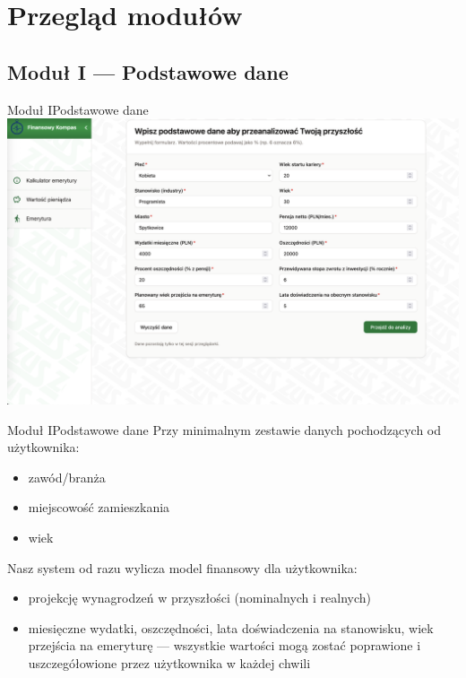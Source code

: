 \section{Przegląd modułów}

\subsection{Moduł I --- Podstawowe dane}

\begin{frame}[t]{Moduł I}{Podstawowe dane}
\includegraphics[width=.8\textwidth]{img/module_1_basic_data}
\end{frame}

\begin{frame}[t]{Moduł I}{Podstawowe dane}
    Przy minimalnym zestawie danych pochodzących od użytkownika:
    \pause
    \begin{itemize}
    \item zawód/branża
    \pause
    \item miejscowość zamieszkania
    \pause
    \item wiek
    \end{itemize}
    \pause
    Nasz system od razu wylicza model finansowy dla użytkownika:
    \begin{itemize}
    \pause
        \item projekcję wynagrodzeń w przyszłości (nominalnych i realnych)
    \pause
        \item miesięczne wydatki, oszczędności, lata doświadczenia na stanowisku, wiek przejścia na emeryturę
\pause --- wszystkie wartości mogą zostać poprawione i uszczegółowione przez użytkownika w każdej chwili
    \end{itemize}
\end{frame}

